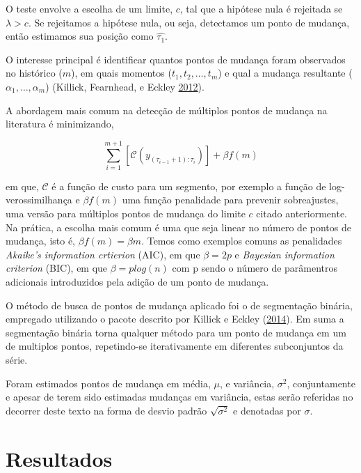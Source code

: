 \documentclass[11pt,brazil,]{article}
\providecommand{\DIFdelbegin}{} %
\providecommand{\DIFdelend}{} %
\newcommand{\DIFscaledelfig}{0.5}
\newlength{\DIFdelgraphicswidth} %
\newlength{\DIFdelgraphicsheight} %
\newcommand{\DIFdelincludegraphics}[2][]{%
\sbox{\DIFdelgraphicsbox}{\DIFOincludegraphics[#1]{#2}}%
\settoboxwidth{\DIFdelgraphicswidth}{\DIFdelgraphicsbox} %
\settoboxtotalheight{\DIFdelgraphicsheight}{\DIFdelgraphicsbox} %
\scalebox{\DIFscaledelfig}{%
\parbox[b]{\DIFdelgraphicswidth}{\usebox{\DIFdelgraphicsbox}\\[-\baselineskip] \rule{\DIFdelgraphicswidth}{0em}}\llap{\resizebox{\DIFdelgraphicswidth}{\DIFdelgraphicsheight}{%
\setlength{\unitlength}{\DIFdelgraphicswidth}%
\begin{picture}(1,1)%
\thicklines\linethickness{2pt} %
{\color[rgb]{1,0,0}\put(0,0){\framebox(1,1){}}}%
{\color[rgb]{1,0,0}\put(0,0){\line( 1,1){1}}}%
{\color[rgb]{1,0,0}\put(0,1){\line(1,-1){1}}}%
\end{picture}%
}\hspace*{3pt}}} %
} %
\DeclareRobustCommand{\DIFdelbegin}{\DIFOdelbegin \let\includegraphics\DIFdelincludegraphics} %
\DeclareRobustCommand{\DIFdelend}{\DIFOaddend \let\includegraphics\DIFOincludegraphics} %
\begin{document}
O teste envolve a escolha de um limite, \(c\), tal que a hipótese nula é
rejeitada se \(\lambda > c\). Se rejeitamos a hipótese nula, ou seja,
detectamos um ponto de mudança, então estimamos sua posição como
\(\hat{\tau_{1}}\).

O interesse principal é identificar quantos pontos de mudança foram
observados no histórico (\(m\)), em quais momentos
(\(t_1, t_2, \ldots, t_m\)) e qual a mudança resultante
(\(\alpha_1, \ldots, \alpha_m\)) (Killick, Fearnhead, e Eckley
\protect\hyperlink{ref-killick2012optimal}{2012}). \DIFdelbegin %

\DIFdelend A abordagem mais
comum na detecção de múltiplos pontos de mudança na literatura é
minimizando,

\[\sum_{i=1}^{m+1}\left[\mathcal{C}\left(y_{\left(\tau_{i-1}+1\right): \tau_{i}}\right)\right]+\beta f(m)\]

em que, \(\mathcal{C}\) é a função de custo para um segmento, por
exemplo a função de log-verossimilhança e \(\beta f(m)\) uma função
penalidade para prevenir sobreajustes, uma versão para múltiplos pontos
de mudança do limite \(c\) citado anteriormente. Na prática, a escolha
mais comum é uma que seja linear no número de pontos de mudança, isto é,
\(\beta f(m) = \beta m\). Temos como exemplos comuns as penalidades
\emph{Akaike's information crtierion} (AIC), em que \(\beta = 2p\) e
\emph{Bayesian information criterion} (BIC), em que \(\beta = plog(n)\)
com p sendo o número de parâmentros adicionais introduzidos pela adição
de um ponto de mudança.

O método de busca de pontos de mudança aplicado foi o de segmentação
binária, empregado utilizando o pacote descrito por Killick e Eckley
(\protect\hyperlink{ref-killick2014changepoint}{2014}). Em suma a
segmentação binária torna qualquer método para um ponto de mudança em um
de multiplos pontos, repetindo-se iterativamente em diferentes
subconjuntos da série.

Foram estimados pontos de mudança em média, \(\mu\), e variância,
\(\sigma^2\), conjuntamente e apesar de terem sido estimadas mudanças em
variância, estas serão referidas no decorrer deste texto na forma de
desvio padrão \(\sqrt{\sigma^2}\) e denotadas por \(\sigma\).

\hypertarget{resultados}{%
\section{Resultados}\label{resultados}}
\end{document}
